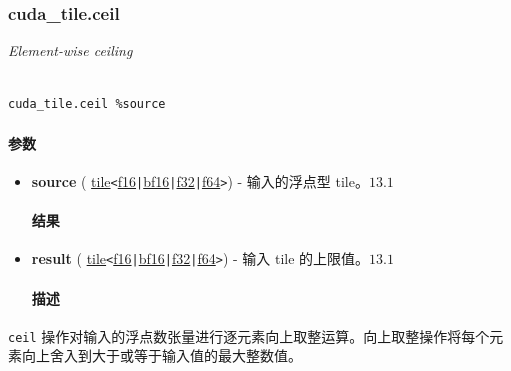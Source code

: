 \documentclass{article}
\begin{document}
\subsubsection{cuda\_tile.ceil}


\textit{Element-wise ceiling}




\begin{lstlisting}

cuda_tile.ceil %source

\end{lstlisting}



\paragraph{参数}


\begin{itemize}
\item \textbf{source} ( \href{https://docs.nvidia.com/cuda/tile-ir/latest/sections/types.html#type-tile}{tile}\texttt{<}\href{https://docs.nvidia.com/cuda/tile-ir/latest/sections/types.html#subsection-element-types}{f16}\texttt{|}\href{https://docs.nvidia.com/cuda/tile-ir/latest/sections/types.html#subsection-element-types}{bf16}\texttt{|}\href{https://docs.nvidia.com/cuda/tile-ir/latest/sections/types.html#subsection-element-types}{f32}\texttt{|}\href{https://docs.nvidia.com/cuda/tile-ir/latest/sections/types.html#subsection-element-types}{f64}\texttt{>}) - 输入的浮点型 tile。$\boxed{13.1}$




\paragraph{结果}


\item \textbf{result} ( \href{https://docs.nvidia.com/cuda/tile-ir/latest/sections/types.html#type-tile}{tile}\texttt{<}\href{https://docs.nvidia.com/cuda/tile-ir/latest/sections/types.html#subsection-element-types}{f16}\texttt{|}\href{https://docs.nvidia.com/cuda/tile-ir/latest/sections/types.html#subsection-element-types}{bf16}\texttt{|}\href{https://docs.nvidia.com/cuda/tile-ir/latest/sections/types.html#subsection-element-types}{f32}\texttt{|}\href{https://docs.nvidia.com/cuda/tile-ir/latest/sections/types.html#subsection-element-types}{f64}\texttt{>}) - 输入 tile 的上限值。$\boxed{13.1}$




\paragraph{描述}


\end{itemize}
\texttt{ceil} 操作对输入的浮点数张量进行逐元素向上取整运算。向上取整操作将每个元素向上舍入到大于或等于输入值的最大整数值。
\end{document}
